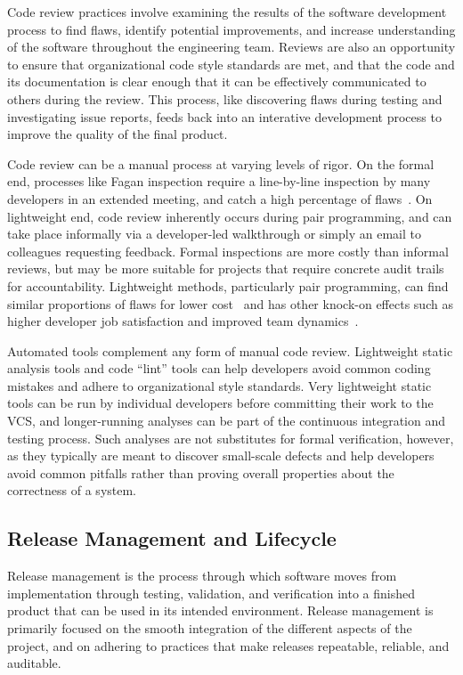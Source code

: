Code review practices involve examining the results of the software
development process to find flaws, identify potential improvements,
and increase understanding of the software throughout the engineering
team. Reviews are also an opportunity to ensure that organizational
code style standards are met, and that the code and its documentation
is clear enough that it can be effectively communicated to others
during the review. This process, like discovering flaws during
testing and investigating issue reports, feeds back into an interative
development process to improve the quality of the final product.

Code review can be a manual process at varying levels of rigor. On the
formal end, processes like Fagan inspection require a line-by-line
inspection by many developers in an extended meeting, and catch a high
percentage of flaws~\cite{fagan2002design}. On lightweight end, code
review inherently occurs during pair programming, and can take place
informally via a developer-led walkthrough or simply an email to
colleagues requesting feedback. Formal inspections are more costly
than informal reviews, but may be more suitable for projects that
require concrete audit trails for accountability. Lightweight methods,
particularly pair programming, can find similar proportions of flaws
for lower cost~\cite{tomayko2002comparison} and has other knock-on
effects such as higher developer job satisfaction and improved team
dynamics~\cite{cockburn2000costs}.

Automated tools complement any form of manual code review. Lightweight
static analysis tools and code ``lint'' tools can help developers
avoid common coding mistakes and adhere to organizational style
standards. Very lightweight static tools can be run by individual
developers before committing their work to the VCS, and longer-running
analyses can be part of the continuous integration and testing
process. Such analyses are not substitutes for formal verification,
however, as they typically are meant to discover small-scale defects
and help developers avoid common pitfalls rather than proving overall
properties about the correctness of a system.

\subsection{Release Management and Lifecycle}

Release management is the process through which software moves from
implementation through testing, validation, and verification into a
finished product that can be used in its intended environment. Release
management is primarily focused on the smooth integration of the
different aspects of the project, and on adhering to practices that
make releases repeatable, reliable, and auditable.

